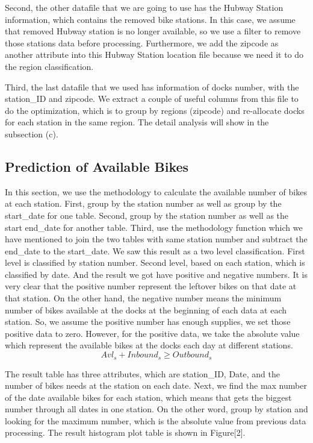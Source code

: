 \documentclass[journal, letterpaper]{IEEEtran}
\begin{document}
Second, the other datafile that we are going to use has the Hubway Station information, which contains the removed bike stations. In this case, we assume that removed Hubway station is no longer available, so we use a filter to remove those stations data before processing. Furthermore, we add the zipcode as another attribute into this Hubway Station location file because we need it to do the region classification. 

Third, the last datafile that we used has information of docks number, with the station\_ID and zipcode. We extract a couple of useful columns from this file to do the optimization, which is to group by regions (zipcode) and re-allocate docks for each station in the same region. The detail analysis will show in the subsection (c).

\subsection{Prediction of Available Bikes}
In this section, we use the methodology to calculate the available number of bikes at each station. First, group by the station number as well as group by the start\_date for one table. Second, group by the station number as well as the start end\_date for another table. Third, use the methodology function which we have mentioned to join the two tables with same station number and subtract the end\_date to the start\_date. We saw this result as a two level classification. First level is classified by station number. Second level, based on each station, which is classified by date. And the result we got have positive and negative numbers. It is very clear that the positive number represent the leftover bikes on that date at that station. On the other hand, the negative number means the minimum number of bikes available at the docks at the beginning of each data at each station. So, we assume the positive number has enough supplies, we set those positive data to zero. However, for the positive data, we take the absolute value which represent the available bikes at the docks each day at different stations. 
$$Avl_{s} + Inbound_{s} \ge Outbound_{s}$$

The result table has three attributes, which are station\_ID, Date, and the number of bikes needs at the station on each date. Next, we find the max number of the date available bikes for each station, which means that gets the biggest number through all dates in one station. On the other word, group by station and looking for the maximum number, which is the absolute value from previous data processing. The result histogram  plot table is shown in Figure[2].
\end{document}
